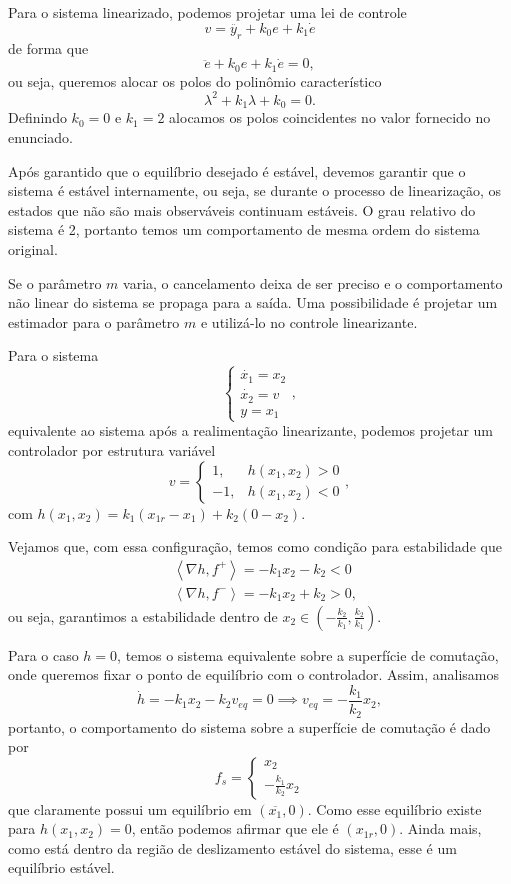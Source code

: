 \documentclass[a4paper]{report}
\begin{document}

Para o sistema linearizado, podemos projetar uma lei de controle \[
v = \ddot{y_r} + k_0e + k_1\dot{e}
\] de forma que \[
\ddot{e} +k_0e + k_1\dot{e} = 0
,\] ou seja, queremos alocar os polos do polinômio característico \[
\lambda^2 + k_1\lambda + k_0 = 0
.\] 
Definindo $k_0=0$ e $k_1=2$ alocamos os polos coincidentes no valor fornecido no enunciado.


Após garantido que o equilíbrio desejado é estável, devemos garantir que o sistema é estável internamente, ou seja, se durante o processo de linearização, os estados que não são mais observáveis continuam estáveis. O grau relativo do sistema é 2, portanto temos um comportamento de mesma ordem do sistema original.


Se o parâmetro $m$ varia, o cancelamento deixa de ser preciso e o comportamento não linear do sistema se propaga para a saída. Uma possibilidade é projetar um estimador para o parâmetro $m$ e utilizá-lo no controle linearizante.



Para o sistema \[
\begin{cases}
    \dot{x_1} = x_2 \\
    \dot{x_2} = v \\
    y = x_1
\end{cases}
,\] equivalente ao sistema após a realimentação linearizante, podemos projetar um controlador por estrutura variável \[
v = \begin{cases}
    1, &h(x_1,x_2) > 0 \\
    -1, &h(x_1,x_2) < 0
\end{cases}
,\] com $h\left( x_1,x_2 \right) =k_1\left( x_{1r}-x_1 \right) + k_2\left( 0-x_2 \right) $.

Vejamos que, com essa configuração, temos como condição para estabilidade que
\begin{align*}
    &\left< \nabla h, f^{+}\right> = -k_1x_2 -k_2 < 0\\
    &\left< \nabla h, f^{-}\right> = -k_1x_2 +k_2 > 0
,\end{align*}
ou seja, garantimos a estabilidade dentro de $x_2\in \left( -\frac{k_2}{k_1}, \frac{k_2}{k_1} \right) $.

Para o caso $h=0$, temos o sistema equivalente sobre a superfície de comutação, onde queremos fixar o ponto de equilíbrio com o controlador. Assim, analisamos \[
    \dot{h} = -k_1x_2 -k_2v_{eq} = 0 \implies v_{eq} = -\frac{k_1}{k_2}x_2
,\] portanto, o comportamento do sistema sobre a superfície de comutação é dado por \[
f_s = \begin{cases}
    x_2 \\
    -\frac{k_1}{k_2}x_2
\end{cases}
\] que claramente possui um equilíbrio em $(\overline{x_1},0)$. Como esse equilíbrio existe para $h(x_1,x_2)=0$, então podemos afirmar que ele é $(x_{1r},0)$. Ainda mais, como está dentro da região de deslizamento estável do sistema, esse é um equilíbrio estável.
\end{document}
